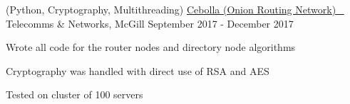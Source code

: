 \begin{cventries}

\cventry
{(Python, Cryptography, Multithreading)} %
{\href{https://github.com/CamiloGarciaLaRotta/Cebolla}{Cebolla (Onion Routing Network) \ \faGithubSquare\acvHeaderIconSep}} %
{Telecomms \& Networks, McGill} %
{September 2017 - December 2017} %
{ %
\begin{cvitems}
\item {Wrote all code for the router nodes and directory node algorithms}
\item {Cryptography was handled with direct use of RSA and AES}
\item {Tested on cluster of 100 servers}
\end{cvitems}
}


\end{cventries}
